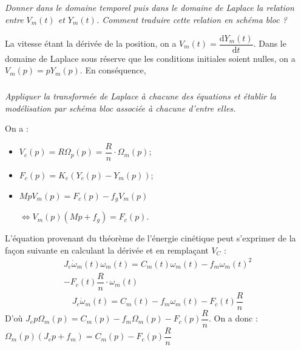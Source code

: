 \documentclass[10pt,fleqn]{article} %
\begin{document}
\begin{multicols}{2}
\subparagraph{} \textit{Donner dans le domaine temporel puis dans le domaine de Laplace la relation entre $V_m(t)$ et $Y_m(t)$. Comment traduire cette relation en schéma bloc ?}
\ifprof
\begin{corrige}
La vitesse étant la dérivée de la position, on a $V_m(t) = \dfrac{\text{d}Y_m(t)}{\text{d}t}$. Dans le domaine de Laplace sous réserve que les conditions initiales soient nulles, on a 
$V_m(p)=pY_m(p)$. En conséquence, 

\begin{center}
\end{center}

\end{corrige}
\else
\fi

\subparagraph{} \textit{Appliquer la transformée de Laplace à chacune des équations et établir la modélisation par schéma bloc associée à chacune d'entre elles.}
\ifprof
\begin{corrige}
On a :
\begin{itemize}
\item [\tiny\color{violet}{ $\blacksquare$}] $V_c(p)=R\Omega_p(p)=\dfrac{R}{n}\cdot \Omega_m(p)$;
\item [\tiny\color{violet}{ $\blacksquare$}] $F_c(p)=K_e\left(Y_c(p) - Y_m(p) \right)$;
\item [\tiny\color{violet}{ $\blacksquare$}] $MpV_m(p) = F_c(p) - f_g V_m(p)$

 $\Longleftrightarrow V_m(p)\left(Mp + f_g \right) = F_c(p) $.
\end{itemize}

L'équation provenant du théorème de l'énergie cinétique peut s'exprimer de la façon suivante en calculant la dérivée et en remplaçant $V_C$ : 
\begin{eqnarray*}J_e \dot{\omega}_m(t) \omega_m(t)= 
C_m(t) \omega_m(t) - f_m\omega_m(t)^2 \\
 - F_c(t) \dfrac{R}{n} \cdot \omega_m(t) 
\end{eqnarray*}
$$
J_e \dot{\omega}_m(t) =  
C_m(t) - f_m\omega_m(t) - F_c(t) \dfrac{R}{n} 
$$
D'où  $J_e p\Omega_m(p) =  
C_m(p) - f_m\Omega_m(p) - F_c(p) \dfrac{R}{n} $. On a donc :
$\Omega_m(p) \left( J_e p + f_m\right) =  
C_m(p)  - F_c(p) \dfrac{R}{n} $ 


\end{corrige}
\end{multicols}
\end{document}
